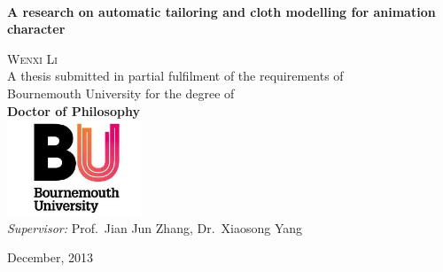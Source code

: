 
\begin{titlepage}

\begin{center}

~\\[1.5cm]
{ \huge \bfseries A research on automatic tailoring and cloth modelling for animation character }\\[3.5cm]



{\large

\textsc{Wenxi Li}\\[1.5cm]

A thesis submitted in partial fulfilment of the requirements of\\ Bournemouth University for the degree of\\[1.5cm]

\textbf{Doctor of Philosophy}\\[0.5cm]
\includegraphics[width=0.3\textwidth]{images/bu_logo}\\[1cm]


\emph{Supervisor:} Prof.~Jian Jun Zhang, Dr.~Xiaosong Yang

}

\vfill

{\large December, 2013}

\end{center}

\end{titlepage}
